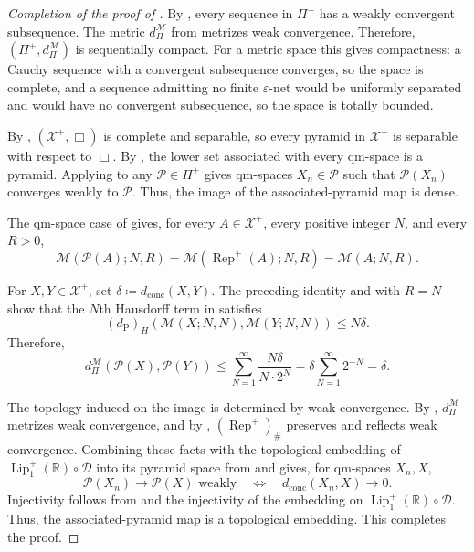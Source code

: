 \documentclass{amsart}
\theoremstyle{plain}
\theoremstyle{definition}
\theoremstyle{remark}
\newcommand{\R}{\mathbb{R}}
\newcommand{\D}{\mathcal{D}}
\newcommand{\Xp}{\mathcal{X}^{+}}
\newcommand{\M}{\mathcal{M}}
\newcommand{\Lup}{\operatorname{Lip}^{+}_{1}(\R)}
\newcommand{\dconc}{d_{\operatorname{conc}}}
\newcommand{\dpr}{d_{\operatorname{P}}}
\newcommand{\haus}[1]{\left(#1\right)_H}
\begin{document}
\begin{proof}[Completion of the proof of ]
By , every sequence in $\Pi^+$ has a weakly convergent subsequence. The metric $d_{\Pi}^{\M}$ from  metrizes weak convergence. Therefore, $(\Pi^+,d_{\Pi}^{\M})$ is sequentially compact. For a metric space this gives compactness: a Cauchy sequence with a convergent subsequence converges, so the space is complete, and a sequence admitting no finite $\varepsilon$-net would be uniformly separated and would have no convergent subsequence, so the space is totally bounded.

By , $(\Xp,\Box)$ is complete and separable, so every pyramid in $\Xp$ is separable with respect to $\Box$. By , the lower set associated with every qm-space is a pyramid. Applying  to any $\mathcal P\in\Pi^+$ gives qm-spaces $X_n\in\mathcal P$ such that $\mathcal P(X_n)$ converges weakly to $\mathcal P$. Thus, the image of the associated-pyramid map is dense.

The qm-space case of  gives, for every $A\in\Xp$, every positive integer $N$, and every $R>0$,
\[\M(\mathcal P(A);N,R)=\M(\operatorname{Rep}^{+}(A);N,R)=\M(A;N,R).\]

For $X,Y\in\Xp$, set $\delta\coloneqq\dconc(X,Y)$. The preceding identity and  with $R=N$ show that the $N$th Hausdorff term in  satisfies
\[\haus{\dpr}\left(\M(X;N,N),\M(Y;N,N)\right)\leq N\delta.\]
Therefore,
\[
d_{\Pi}^{\M}(\mathcal P(X),\mathcal P(Y))
\leq\sum_{N=1}^{\infty}\frac{N\delta}{N\cdot2^N}
=\delta\sum_{N=1}^{\infty}2^{-N}
=\delta.
\]

The topology induced on the image is determined by weak convergence. By , $d_{\Pi}^{\M}$ metrizes weak convergence, and by , $(\operatorname{Rep}^{+})_{\#}$ preserves and reflects weak convergence. Combining these facts with the topological embedding of $\Lup\circ\D$ into its pyramid space from \cite[Proposition~7.3]{gds2} and  gives, for qm-spaces $X_n,X$,
\[
\mathcal P(X_n)\longrightarrow\mathcal P(X)\text{ weakly}
\quad\Longleftrightarrow\quad
\dconc(X_n,X)\longrightarrow0.
\]
Injectivity follows from  and the injectivity of the embedding on $\Lup\circ\D$. Thus, the associated-pyramid map is a topological embedding. This completes the proof.
\end{proof}
\end{document}
